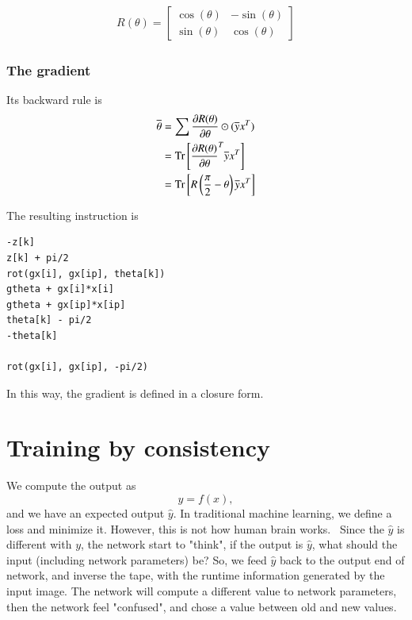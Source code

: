 \documentclass[aps,twocolumn,longbibliography,english,superscriptaddress,prr]{revtex4-1}
\newcommand{\<}{\langle}
\renewcommand{\>}{\rangle}
\newcommand{\Tr}{{\rm Tr}}
\begin{document}
\begin{align}
    R(\theta)  = \begin{bmatrix}
        \cos(\theta) & - \sin(\theta)\\
        \sin(\theta)  & \cos(\theta)
    \end{bmatrix}
\end{align}

\subsubsection{The gradient}

Its backward rule is
\begin{align}
    \begin{split}
    \overline{\theta}  &= \sum\frac{\partial R(\theta)}{\partial \theta}\odot(\overline{y}x^T)\\
    &= \Tr\left[\frac{\partial R(\theta)}{\partial \theta}^T\overline{y}x^T\right]\\
    &= \Tr\left[R\left(\frac{\pi}{2}-\theta\right)\overline{y}x^T\right]
    \end{split}
\end{align}

The resulting instruction is

\begin{minipage}{.44\textwidth}
\begin{lstlisting}[basicstyle=\small\ttfamily,columns=fullflexible]
-z[k]
z[k] + pi/2
rot(gx[i], gx[ip], theta[k])
gtheta + gx[i]*x[i]
gtheta + gx[ip]*x[ip]
theta[k] - pi/2
-theta[k]

rot(gx[i], gx[ip], -pi/2)
\end{lstlisting}
\end{minipage}

In this way, the gradient is defined in a closure form.

\section{Training by consistency}
We compute the output as
\begin{equation}
    y = f(x),
\end{equation}
and we have an expected output $\hat{y}$. In traditional machine learning, we define a loss and minimize it. However, this is not how human brain works.~\cite{Hintoncomment}
Since the $\hat{y}$ is different with $y$, the network start to "think", if the output is $\hat{y}$, what should the input (including network parameters) be?
So, we feed $\hat{y}$ back to the output end of network, and inverse the tape, with the runtime information generated by the input image. The network will compute a different value to network parameters, then the network feel "confused", and chose a value between old and new values.
\end{document}
